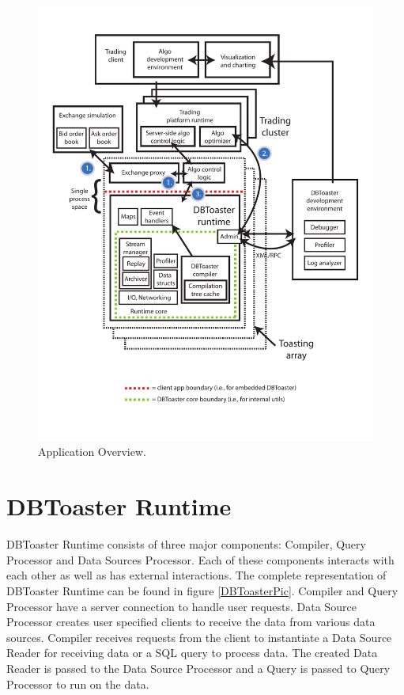 \documentclass[11pt]{article}
\begin{document}
\begin{figure}
  \includegraphics[width=4.50in]{../figures/finapp.pdf}
  \caption{Application Overview.}
  \label{TheBigPicture}
\end{figure}



\section{DBToaster Runtime}

DBToaster Runtime consists of three major components: Compiler, Query Processor and Data Sources Processor. Each of these components interacts with each other as well as has external interactions. The complete representation of DBToaster Runtime can be found in figure \ref{DBToasterPic}. Compiler and Query Processor have a server connection to handle user requests. Data Source Processor creates user specified clients to receive the data from various data sources. Compiler receives requests from the client to instantiate a Data Source Reader for receiving data or a SQL query to process data. The created Data Reader is passed to the Data Source Processor and a Query is passed to Query Processor to run on the data. 
\end{document}
